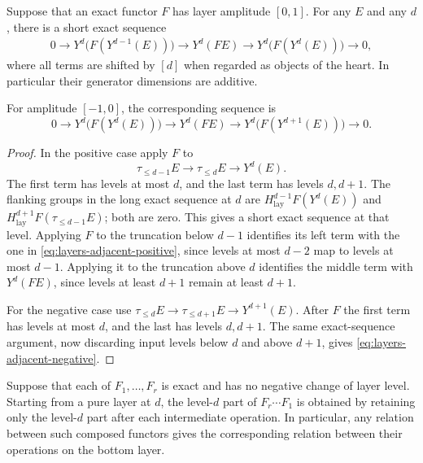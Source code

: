 \begin{lemma}
\label{lem:layers-amplitude-extension}
Suppose that an exact functor $F$ has layer amplitude $[0,1]$.
For any $E$ and any $d$, there is a short exact sequence
\begin{equation}
\begin{split}
0\longrightarrow Y^d\bigl(F(Y^{d-1}(E))\bigr)
\longrightarrow Y^d(FE)
\longrightarrow Y^d\bigl(F(Y^d(E))\bigr)
\longrightarrow0,
\end{split}
\label{eq:layers-adjacent-positive}
\end{equation}
where all terms are shifted by $[d]$ when regarded as objects of the
heart.  In particular their generator dimensions are additive.

For amplitude $[-1,0]$, the corresponding sequence is
\begin{equation}
0\longrightarrow Y^d\bigl(F(Y^d(E))\bigr)
\longrightarrow Y^d(FE)
\longrightarrow Y^d\bigl(F(Y^{d+1}(E))\bigr)
\longrightarrow0.
\label{eq:layers-adjacent-negative}
\end{equation}
\end{lemma}

\begin{proof}
In the positive case apply $F$ to
\[
 \tau_{\leq d-1}E\longrightarrow\tau_{\leq d}E
 \longrightarrow Y^d(E).
\]
The first term has levels at most $d$, and the last term has levels
$d,d+1$.  The flanking groups in the long exact sequence at $d$ are
$H^{d-1}_{\mathrm{lay}}F(Y^d(E))$ and
$H^{d+1}_{\mathrm{lay}}F(\tau_{\leq d-1}E)$; both are zero.
This gives a short exact sequence at that level.  Applying $F$ to
the truncation below $d-1$ identifies its left term with the one in
\eqref{eq:layers-adjacent-positive}, since levels at most $d-2$ map
to levels at most $d-1$.  Applying it to the truncation above $d$
identifies the middle term with $Y^d(FE)$, since levels at least
$d+1$ remain at least $d+1$.

For the negative case use
$\tau_{\leq d}E\to\tau_{\leq d+1}E\to Y^{d+1}(E)$.
After $F$ the first term has levels at most $d$, and the last has
levels $d,d+1$.  The same exact-sequence argument, now discarding
input levels below $d$ and above $d+1$, gives
\eqref{eq:layers-adjacent-negative}.
\end{proof}

\begin{lemma}
\label{lem:layers-bottom-composition}
Suppose that each of $F_1,\ldots,F_r$ is exact and has no negative
change of layer level.  Starting from a pure layer at $d$, the
level-$d$ part of $F_r\cdots F_1$ is obtained by retaining only the
level-$d$ part after each intermediate operation.  In particular,
any relation between such composed functors gives the corresponding
relation between their operations on the bottom layer.
\end{lemma}


